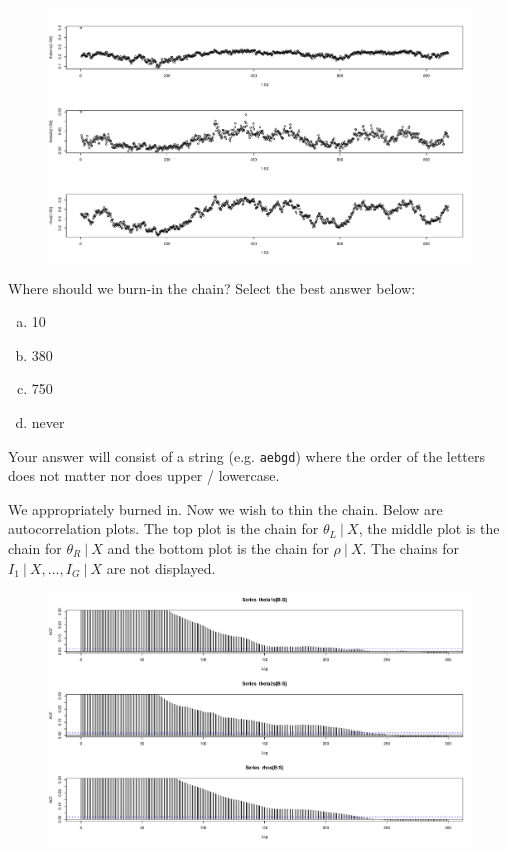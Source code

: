 \documentclass[12pt]{article}
\newcommand{\instr}{\scriptsize Your answer will consist of a string (e.g. \texttt{aebgd}) where the order of the letters does not matter nor does upper / lowercase. \normalsize}
\begin{document}
\begin{figure}[h]
\centering
\includegraphics[width=7in]{burn}
\end{figure}

\benum{} Where should we burn-in the chain? Select the best answer below:

\begin{enumerate}[(a)]
\item 10
\item 380
\item 750
\item never
\end{enumerate}\eenum\instr\pagebreak


\problem [4min]  We appropriately burned in. Now we wish to thin the chain. Below are autocorrelation plots. The top plot is the chain for $\theta_L~|~X$, the middle plot is the chain for $\theta_R~|~X$ and the bottom plot is the chain for $\rho~|~X$. The chains for $I_1~|~X, \ldots, I_G~|~X$ are not displayed.

\begin{figure}[h]
\centering
\includegraphics[width=7in]{thin}
\end{figure}
\end{document}
